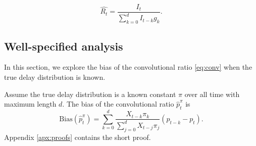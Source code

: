 \documentclass{article}
\begin{document}
\begin{equation}\label{eq:instRt}
    \hat{R_t} = \frac{I_t}{\sum_{k=0}^d I_{t-k}g_k}.
\end{equation}


\subsection{Well-specified analysis}\label{sec:ws_analysis}

In this section, we explore the bias of the convolutional ratio \eqref{eq:conv} when the true delay distribution is known.

\begin{theorem}\label{thm:OracleBias}
    Assume the true delay distribution is a known constant $\pi$ over all time with maximum length $d$. The bias of the convolutional ratio $\hat{p}_t^\pi$ is
\begin{equation*}
    \text{Bias}(\hat{p}_t^\pi) = \sum_{k=0}^d \frac{X_{t-k}\pi_k}{\sum_{j=0}^d X_{t-j}\pi_j} (p_{t-k}-p_t).
\end{equation*}
\noindent Appendix \ref{apx:proofs} contains the short proof.
\end{theorem}
\end{document}
